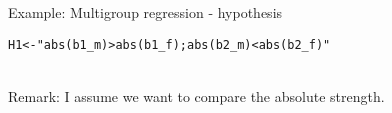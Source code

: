 \documentclass[10pt]{beamer}\usepackage[]{graphicx}\usepackage[]{xcolor}
\makeatletter
\newcommand{\hlsng}[1]{\textcolor[rgb]{0.192,0.494,0.8}{#1}}%
\newcommand{\hldef}[1]{\textcolor[rgb]{0.345,0.345,0.345}{#1}}%
\newcommand{\hlkwb}[1]{\textcolor[rgb]{0.69,0.353,0.396}{#1}}%
\newenvironment{kframe}{%
 \def\at@end@of@kframe{}%
 \ifinner\ifhmode%
  \def\at@end@of@kframe{\end{minipage}}%
  \begin{minipage}{\columnwidth}%
 \fi\fi%
 \def\FrameCommand##1{\hskip\@totalleftmargin \hskip-\fboxsep
 \colorbox{shadecolor}{##1}\hskip-\fboxsep
     \hskip-\linewidth \hskip-\@totalleftmargin \hskip\columnwidth}%
 \MakeFramed {\advance\hsize-\width
   \@totalleftmargin\z@ \linewidth\hsize
   \@setminipage}}%
 {\par\unskip\endMakeFramed%
 \at@end@of@kframe}
\newenvironment{knitrout}{}{} %
\makeatother
\begin{document}
%
\begin{frame}[fragile]{Example: Multigroup regression - hypothesis}


\begin{knitrout}
\color{fgcolor}\begin{kframe}
\begin{alltt}
\hldef{H1} \hlkwb{<-} \hlsng{"abs(b1_m) > abs(b1_f);  abs(b2_m) < abs(b2_f)"}
\end{alltt}
\end{kframe}
\end{knitrout}
~\\
Remark: I assume we want to compare the absolute strength.
        
\end{frame}
%
\end{document}
